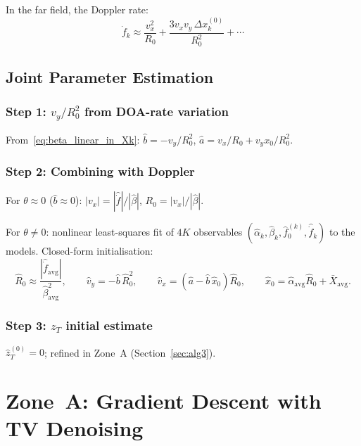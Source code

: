 \documentclass[11pt,a4paper]{article}
\begin{document}
In the far field, the Doppler rate:
\begin{equation}
  \dot{f}_k \approx \frac{v_x^2}{R_0}
  + \frac{3v_x v_y\,\Delta x_k^{(0)}}{R_0^2} + \cdots
  \label{eq:fdot_k}
\end{equation}

\subsection{Joint Parameter Estimation}
\label{sec:joint_zone_b}

\subsubsection{Step 1: $v_y/R_0^2$ from DOA-rate variation}
From~\eqref{eq:beta_linear_in_Xk}:
$\hat{b}=-v_y/R_0^2$, $\hat{a}=v_x/R_0+v_y x_0/R_0^2$.

\subsubsection{Step 2: Combining with Doppler}
For $\theta\approx 0$ ($\hat{b}\approx 0$):
$|v_x|=|\hat{\dot{f}}|/|\hat{\beta}|$,\;
$R_0=|v_x|/|\hat{\beta}|$.

For $\theta\ne 0$: nonlinear least-squares fit of $4K$
observables $(\hat{\alpha}_k,\hat{\beta}_k,
\hat{f}_0^{(k)},\hat{\dot{f}}_k)$ to the models.  Closed-form
initialisation:
\begin{equation}
  \hat{R}_0 \approx
  \frac{|\hat{\dot{f}}_{\mathrm{avg}}|}
  {\hat{\beta}_{\mathrm{avg}}^2},\qquad
  \hat{v}_y = -\hat{b}\,\hat{R}_0^2,\qquad
  \hat{v}_x = (\hat{a}-\hat{b}\,\hat{x}_0)\hat{R}_0,\qquad
  \hat{x}_0 = \hat{\alpha}_{\mathrm{avg}}\hat{R}_0
  +\bar{X}_{\mathrm{avg}}.
  \label{eq:joint_init}
\end{equation}

\subsubsection{Step 3: $z_T$ initial estimate}
$\hat{z}_T^{(0)}=0$; refined in Zone~A
(Section~\ref{sec:alg3}).

\section{Zone~A: Gradient Descent with TV Denoising}
\label{sec:zone_a}
\end{document}
